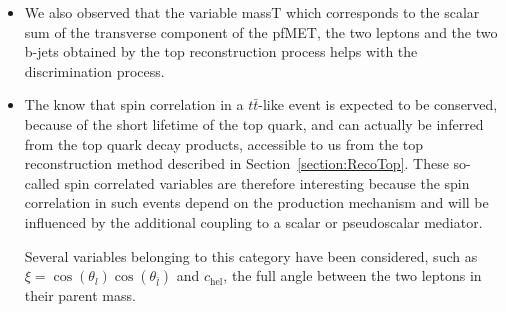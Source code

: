 \documentclass[a4paper, 10pt, openright]{report}
\begin{document}
\begin{itemize}
\item We also observed that the variable massT which corresponds to the scalar sum of the transverse component of the pf\ac{MET}, the two leptons and the two b-jets obtained by the top reconstruction process helps with the discrimination process.%


\item The know that spin correlation in a $t \bar t$-like event is expected to be conserved, because of the short lifetime of the top quark, and can actually be inferred from the top quark decay products, accessible to us from the top reconstruction method described in Section~\ref{section:RecoTop}. These so-called spin correlated variables are therefore interesting because the spin correlation in such events depend on the production mechanism and will be influenced by the additional coupling to a scalar or pseudoscalar mediator.

Several variables belonging to this category have been considered, such as $\xi = \cos(\theta_l) \cos(\theta_{\bar l})$ and $c_{\text{hel}}$, the full angle between the two leptons in their parent mass.%


\end{itemize}
\end{document}
